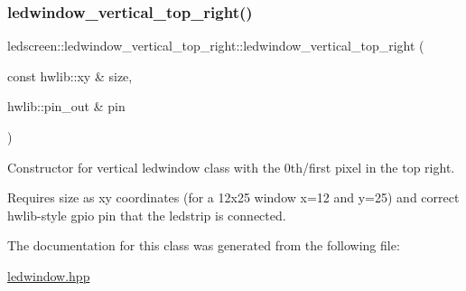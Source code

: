 \subsubsection{\texorpdfstring{ledwindow\+\_\+vertical\+\_\+top\+\_\+right()}{ledwindow\_vertical\_top\_right()}}
{\footnotesize\ttfamily ledscreen\+::ledwindow\+\_\+vertical\+\_\+top\+\_\+right\+::ledwindow\+\_\+vertical\+\_\+top\+\_\+right (\begin{DoxyParamCaption}\item[{const hwlib\+::xy \&}]{size,  }\item[{hwlib\+::pin\+\_\+out \&}]{pin }\end{DoxyParamCaption})\hspace{0.3cm}{\ttfamily [inline]}}



Constructor for vertical ledwindow class with the 0th/first pixel in the top right. 

Requires size as xy coordinates (for a 12x25 window x=12 and y=25) and correct hwlib-\/style gpio pin that the ledstrip is connected. 

The documentation for this class was generated from the following file\+:\begin{DoxyCompactItemize}
\item 
\hyperlink{ledwindow_8hpp}{ledwindow.\+hpp}\end{DoxyCompactItemize}

